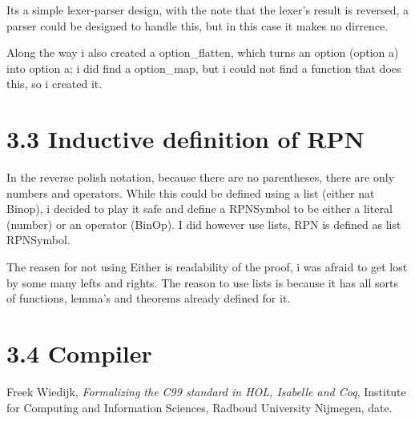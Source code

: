 \documentclass[10pt,a4paper,usenames,dvipnames]{article}
\begin{document}
Its a simple lexer-parser design, with the note that the lexer's result is reversed, a parser could be designed to handle this, but in this case it makes no dirrence.

Along the way i also created a option\_flatten, which turns an option (option a) into option a; i did find a option\_map, but i could not find a function that does this, so i created it.

\section*{3.3 Inductive definition of RPN }

In the reverse polish notation, because there are no parentheses, there are only numbers and operators. While this could be defined using a list (either nat Binop), i decided to play it safe and define a RPNSymbol to be either a literal (number) or an operator (BinOp). I did however use lists, RPN is defined as list RPNSymbol.

The reasen for not using Either is readability of the proof, i was afraid to get lost by some many lefts and rights. The reason to use lists is because it has all sorts of functions, lemma's and theorems already defined for it.

\section*{3.4 Compiler }



\begin{thebibliography}{9}

	Freek Wiedijk, 
	\emph{Formalizing the C99 standard in HOL, Isabelle and Coq}, 
	Institute for Computing and Information Sciences, Radboud University Nijmegen, 
	date.

\end{thebibliography}
\end{document}
